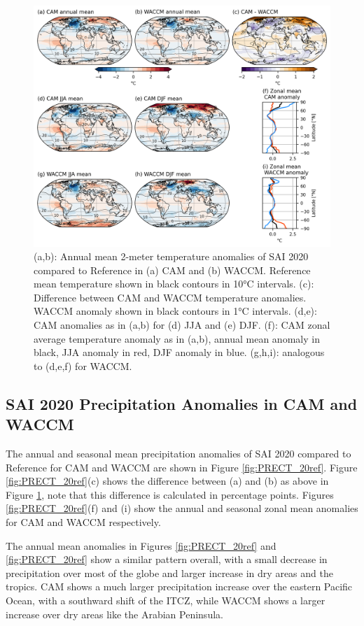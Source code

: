 \begin{figure}[H]
	\centering
	\includegraphics[width=0.95\linewidth]{images/TREFHT_20ref.png}
	\caption{(a,b): Annual mean 2-meter temperature anomalies of SAI 2020 compared to Reference in (a) CAM and (b) WACCM. Reference mean temperature shown in black contours in 10°C intervals. (c): Difference between CAM and WACCM temperature anomalies. WACCM anomaly shown in black contours in 1°C intervals. (d,e): CAM anomalies as in (a,b) for (d) JJA and (e) DJF. (f): CAM zonal average temperature anomaly as in (a,b), annual mean anomaly in black, JJA anomaly in red, DJF anomaly in blue. (g,h,i): analogous to (d,e,f) for WACCM.}
	\label{fig:TREFHT_20ref}
\end{figure}


\subsection{SAI 2020 Precipitation Anomalies in CAM and WACCM}
The annual and seasonal mean precipitation anomalies of SAI 2020 compared to Reference for CAM and WACCM are shown in Figure \ref{fig:PRECT_20ref}. Figure \ref{fig:PRECT_20ref}(c) shows the difference between (a) and (b) as above in Figure \ref{fig:TREFHT_20ref}, note that this difference is calculated in percentage points. Figures \ref{fig:PRECT_20ref}(f) and (i) show the annual and seasonal zonal mean anomalies for CAM and WACCM respectively. 

The annual mean anomalies in Figures \ref{fig:PRECT_20ref} and \ref{fig:PRECT_20ref} show a similar pattern overall, with a small decrease in precipitation over most of the globe and larger increase in dry areas and the tropics. CAM shows a much larger precipitation increase over the eastern Pacific Ocean, with a southward shift of the ITCZ, while WACCM shows a larger increase over dry areas like the Arabian Peninsula. 

